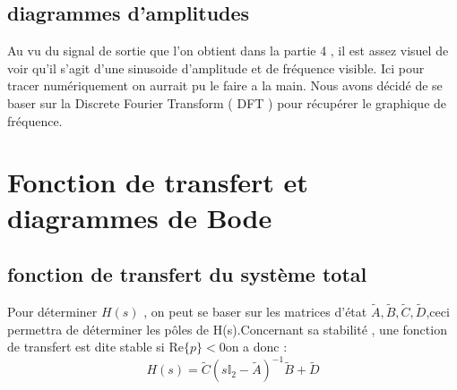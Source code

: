 \documentclass[11pt,a4paper]{article}
\begin{document}
\subsection{diagrammes d'amplitudes}
Au vu du signal de sortie que l'on obtient dans la partie 4 , il est assez visuel de voir qu'il s'agit d'une sinusoide d'amplitude et de fréquence visible.
Ici pour tracer numériquement on aurrait pu le faire a la main. Nous avons décidé de se baser sur la Discrete Fourier Transform ( DFT ) pour récupérer le graphique de fréquence.
\section{Fonction de transfert et diagrammes de Bode}
\subsection{fonction de transfert du système total}
Pour déterminer $H(s)$ , on peut se baser sur les matrices d'état
$\tilde{A},\tilde{B},\tilde{C},\tilde{D}$,ceci permettra de déterminer les pôles de H(s).Concernant sa stabilité , une fonction de transfert est dite stable si $\mathrm {Re} \{ p\}<0$on a donc : \\
$$H(s)=\tilde{C} \left (s \mathbb{I} _2 - \tilde{A} \right)^{-1} \tilde{B} + \tilde{D} $$
\end{document}

